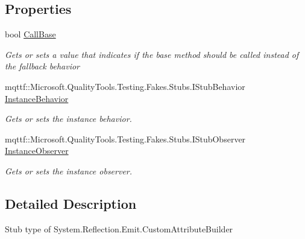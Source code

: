 \subsection*{Properties}
\begin{DoxyCompactItemize}
\item 
bool \hyperlink{class_system_1_1_reflection_1_1_emit_1_1_fakes_1_1_stub_custom_attribute_builder_aa58c6e37be7b16eebb84053af9ac460a}{Call\-Base}
\begin{DoxyCompactList}\small\item\em Gets or sets a value that indicates if the base method should be called instead of the fallback behavior\end{DoxyCompactList}\item 
mqttf\-::\-Microsoft.\-Quality\-Tools.\-Testing.\-Fakes.\-Stubs.\-I\-Stub\-Behavior \hyperlink{class_system_1_1_reflection_1_1_emit_1_1_fakes_1_1_stub_custom_attribute_builder_a2a491d3e7f3707fc9ab34d504b5c700a}{Instance\-Behavior}
\begin{DoxyCompactList}\small\item\em Gets or sets the instance behavior.\end{DoxyCompactList}\item 
mqttf\-::\-Microsoft.\-Quality\-Tools.\-Testing.\-Fakes.\-Stubs.\-I\-Stub\-Observer \hyperlink{class_system_1_1_reflection_1_1_emit_1_1_fakes_1_1_stub_custom_attribute_builder_a417e058dc241226a06eb0db77d9ae0a6}{Instance\-Observer}
\begin{DoxyCompactList}\small\item\em Gets or sets the instance observer.\end{DoxyCompactList}\end{DoxyCompactItemize}


\subsection{Detailed Description}
Stub type of System.\-Reflection.\-Emit.\-Custom\-Attribute\-Builder



